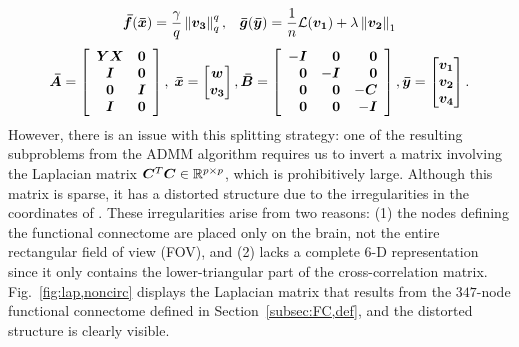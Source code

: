 \begin{equation}
	\begin{array}{c}
		\fbar(\xbar)=\dstyle\frac{\gamma}{q}\norm{\vc}^q_q , \;\;\;
		\gbar(\ybar)=\dstyle\frac{1}{n}\Loss(\va) + \lambda\norm{\vb}_1  
		\vspace{0.02\linewidth} \\
		\Abar = 	\ba{cc} 	\Y\X	& \bzero \\ \I	& \bzero \\ \bzero 	& \I \\ \I & \bzero \ea 	, \;
		\xbar = \bmat \w \\ \vc \emat, 
		\Bbar = 	\ba{rrr} 	-\I 	& \bzero	& \bzero \\ \bzero & -\I & \bzero  \\ 
						 \bzero & \bzero & -\C \\ \bzero & \bzero & -\I \ea,
		\ybar = \bmat \va \\ \vb \\ \vd \emat 	.
	\end{array}
	\label{eqn:admm,objective1}
\end{equation}
However, there is an issue with this splitting strategy: one of the resulting subproblems from the ADMM algorithm requires us to invert a matrix involving the Laplacian matrix ${\bm{C}}^T{\bm{C}}\in\mathbb{R}^{p\times p}$, which is prohibitively large.
Although this matrix is sparse, it has a distorted structure due to the irregularities in the coordinates of \x.
These irregularities arise from two reasons:
(1) the nodes defining the functional connectome \x are placed only on the brain, not the entire rectangular field of view (FOV), and
(2) \x lacks a complete $6$-D representation since it only contains the lower-triangular part of the cross-correlation matrix.
Fig.~\ref{fig:lap,noncirc} displays the Laplacian matrix that results from the $347$-node functional connectome defined in Section~\ref{subsec:FC,def}, and the distorted structure is clearly visible.


